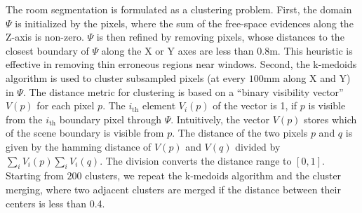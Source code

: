 The room segmentation is formulated as a clustering problem.
First, the domain $\Psi$ is initialized by the pixels, where the sum of
the free-space evidences along the Z-axis is non-zero.
$\Psi$ is then refined by removing pixels, whose distances to the
closest boundary of $\Psi$ along the X or Y axes are less than
$0.8$m. This heuristic is effective in removing thin erroneous regions
near windows. Second, the k-medoids algorithm is used to cluster
subsampled pixels (at every $100$mm along X and Y) in $\Psi$.
%
%
The distance metric for clustering is based on a ``binary visibility
vector'' $V(p)$ for each pixel $p$.
%
%
The $i_{\mbox{th}}$ element $V_i(p)$ of the vector is 1, if $p$ is
visible from the $i_{\mbox{th}}$ boundary pixel through $\Psi$.
Intuitively, the vector $V(p)$ stores which of the scene boundary is
visible from $p$.
The distance of the two pixels $p$ and $q$ is given by the hamming
distance of $V(p)$ and $V(q)$ divided by $\sum_i V_i(p) \sum_i
V_i(q)$. The division converts the distance range to $[0, 1]$.
%
Starting from $200$ clusters, we repeat the k-medoids
algorithm and the cluster merging, where two adjacent clusters are
merged if the distance between their centers is less than 0.4.

